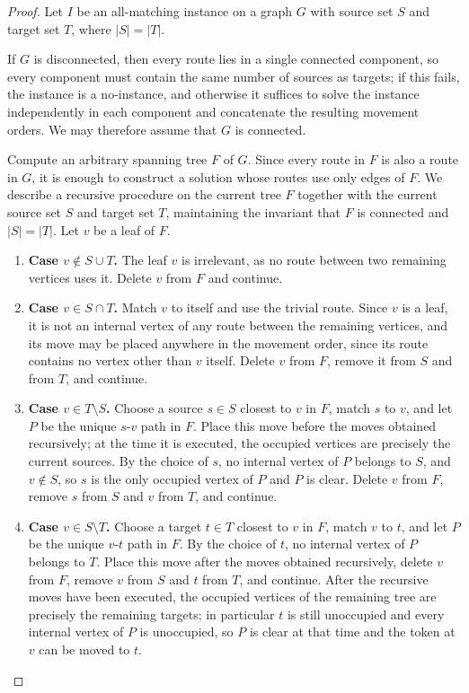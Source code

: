\documentclass[a4paper,USenglish,thm-restate]{lipics-v2021}
\theoremstyle{problemstyle}
\begin{document}
\begin{proof}
Let $I$ be an all-matching instance on a graph $G$ with source set $S$ and
target set $T$, where $|S|=|T|$.

If $G$ is disconnected, then every route lies in a single connected component,
so every component must contain the same number of sources as targets; if this
fails, the instance is a no-instance, and otherwise it suffices to solve the
instance independently in each component and concatenate the resulting movement
orders. We may therefore assume that $G$ is connected.

Compute an arbitrary spanning tree $F$ of $G$. Since every route in $F$ is also
a route in $G$, it is enough to construct a solution whose routes use only
edges of $F$. We describe a recursive procedure on the current tree $F$ together
with the current source set $S$ and target set $T$, maintaining the invariant
that $F$ is connected and $|S|=|T|$. Let $v$ be a leaf of $F$.

\begin{enumerate}
\item \textbf{Case $v\notin S\cup T$.} The leaf $v$ is irrelevant, as no route
between two remaining vertices uses it. Delete $v$ from $F$ and continue.

\item \textbf{Case $v\in S\cap T$.} Match $v$ to itself and use the trivial
route. Since $v$ is a leaf, it is not an internal vertex of any route between
the remaining vertices, and its move may be placed anywhere in the movement
order, since its route contains no vertex other than $v$ itself. Delete $v$
from $F$, remove it from $S$ and from $T$, and continue.

\item \textbf{Case $v\in T\setminus S$.} Choose a source $s\in S$ closest to $v$
in $F$, match $s$ to $v$, and let $P$ be the unique $s$-$v$ path in $F$. Place
this move before the moves obtained recursively; at the time it is executed,
the occupied vertices are precisely the current sources. By the choice of $s$,
no internal vertex of $P$ belongs to $S$, and $v\notin S$, so $s$ is the only
occupied vertex of $P$ and $P$ is clear. Delete $v$ from $F$, remove $s$ from
$S$ and $v$ from $T$, and continue.

\item \textbf{Case $v\in S\setminus T$.} Choose a target $t\in T$ closest to $v$
in $F$, match $v$ to $t$, and let $P$ be the unique $v$-$t$ path in $F$. By the
choice of $t$, no internal vertex of $P$ belongs to $T$. Place this move after
the moves obtained recursively, delete $v$ from $F$, remove $v$ from $S$ and $t$
from $T$, and continue. After the recursive moves have been executed, the
occupied vertices of the remaining tree are precisely the remaining targets; in
particular $t$ is still unoccupied and every internal vertex of $P$ is
unoccupied, so $P$ is clear at that time and the token at $v$ can be moved
to $t$.
\end{enumerate}


\end{proof}
\end{document}
